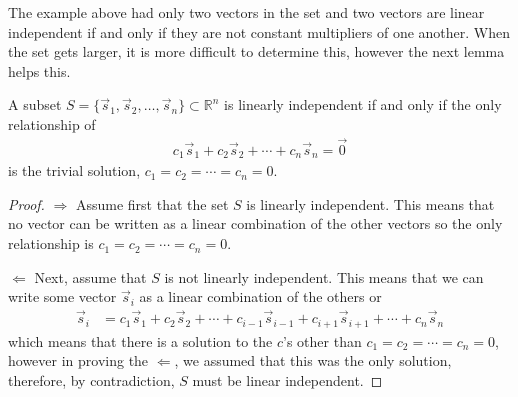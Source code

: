 The example above had only two vectors in the set and two vectors are linear independent if and only if they are not constant multipliers of one another.  When the set gets larger, it is more difficult to determine this, however the next lemma helps this. 

\begin{lemma}  \label{lemma:lin:ind}
A subset $S=\{\vec{s}_1, \vec{s}_2, \ldots, \vec{s}_n\} \subset \mathbb{R}^n$ is linearly independent if and only if the only relationship of 
%
\begin{align*}
c_1 \vec{s}_1 + c_2 \vec{s}_2 + \cdots + c_n \vec{s}_n = \vec{0}
\end{align*}
is the trivial solution, $c_1=c_2 = \cdots = c_n =0$.  

\end{lemma}

\begin{proof}
$\Longrightarrow$ Assume first that the set $S$ is linearly independent.   This means that no vector can be written as a linear combination of the other vectors so the only relationship is $c_1=c_2 = \cdots = c_n =0$.

$\Longleftarrow$ Next, assume that $S$ is not linearly independent.  This means that we can write some vector $\vec{s}_i$ as a linear combination of the others or
%
\begin{align*}
\vec{s}_i & = c_1 \vec{s}_1 + c_2 \vec{s}_2 + \cdots + c_{i-1} \vec{s}_{i-1} + c_{i+1} \vec{s}_{i+1} + \cdots + c_n \vec{s}_n
\end{align*}
which means that there is a solution to the $c$'s other than $c_1=c_2 = \cdots = c_n =0$, however in proving the $\Longleftarrow$, we assumed that this was the only solution, therefore, by contradiction, $S$ must be linear independent.  
\end{proof}

\vspace{1in}

